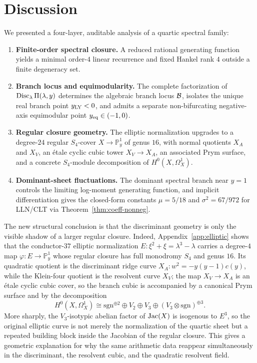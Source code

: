 \section{Discussion}\label{sec:discussion}

We presented a four-layer, auditable analysis of a quartic spectral family:
\begin{enumerate}
  \item \textbf{Finite-order spectral closure.} A reduced rational generating function yields a minimal order-\(4\) linear recurrence and fixed Hankel rank \(4\) outside a finite degeneracy set.
  \item \textbf{Branch locus and equimodularity.} The complete factorization of \(\operatorname{Disc}_\lambda\Pi(\lambda,y)\) determines the algebraic branch locus \(\mathcal{B}\), isolates the unique real branch point \(y_{\mathrm{LY}}<0\), and admits a separate non-bifurcating negative-axis equimodular point \(y_{\mathrm{eq}}\in(-1,0)\).
  \item \textbf{Regular closure geometry.} The elliptic normalization upgrades to a degree-\(24\) regular \(S_4\)-cover \(X\to\mathbb{P}^1_y\) of genus \(16\), with normal quotients \(X_A\) and \(X_V\), an \'etale cyclic cubic tower \(X_V\to X_A\), an associated Prym surface, and a concrete \(S_4\)-module decomposition of \(H^0(X,\Omega_X^1)\).
  \item \textbf{Dominant-sheet fluctuations.} The dominant spectral branch near \(y=1\) controls the limiting log-moment generating function, and implicit differentiation gives the closed-form constants \(\mu=5/18\) and \(\sigma^2=67/972\) for LLN/CLT via Theorem~\ref{thm:coeff-nonneg}.
\end{enumerate}

The new structural conclusion is that the discriminant geometry is only the visible shadow of a larger regular closure.
Indeed, Appendix~\ref{app:elliptic} shows that the conductor-\(37\) elliptic normalization \(E:\xi^2+\xi=\lambda^3-\lambda\) carries a degree-\(4\) map \(\varphi:E\to\mathbb{P}^1_y\) whose regular closure has full monodromy \(S_4\) and genus \(16\).
Its quadratic quotient is the discriminant ridge curve \(X_A:w^2=-y(y-1)c(y)\), while the Klein-four quotient is the resolvent curve \(X_V\); the map \(X_V\to X_A\) is an \'etale cyclic cubic cover, so the branch cubic is accompanied by a canonical Prym surface and by the decomposition
\[
H^0(X,\Omega_X^1)\cong \mathrm{sgn}^{\oplus 2}\oplus V_2\oplus V_3\oplus (V_3\otimes\mathrm{sgn})^{\oplus 3}.
\]
More sharply, the \(V_3\)-isotypic abelian factor of \(\operatorname{Jac}(X)\) is isogenous to \(E^3\), so the original elliptic curve is not merely the normalization of the quartic sheet but a repeated building block inside the Jacobian of the regular closure.
This gives a geometric explanation for why the same arithmetic data reappear simultaneously in the discriminant, the resolvent cubic, and the quadratic resolvent field.


